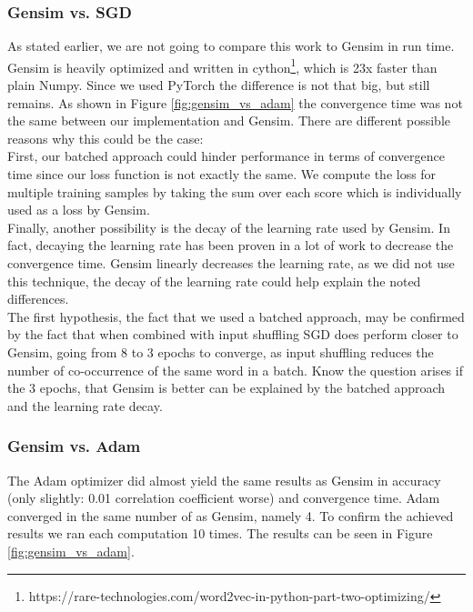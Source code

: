 \subsubsection{Gensim vs. SGD}
As stated earlier, we are not going to compare this work to Gensim in run time. Gensim is heavily optimized and written in cython\footnote{https://rare-technologies.com/word2vec-in-python-part-two-optimizing/}, which is 23x faster than plain Numpy. Since we used PyTorch the difference is not that big, but still remains. As shown in Figure \ref{fig:gensim_vs_adam} the convergence time was not the same between our implementation and Gensim. There are different possible reasons why this could be the case:\\ First, our batched approach could hinder performance in terms of convergence time since our loss function is not exactly the same. We compute the loss for multiple training samples by taking the sum over each score which is individually used as a loss by Gensim.\\ Finally, another possibility is the decay of the learning rate used by Gensim. In fact, decaying the learning rate has been proven in a lot of work to decrease the convergence time. Gensim linearly decreases the learning rate, as we did not use this technique, the decay of the learning rate could help explain the noted differences. \\ The first hypothesis, the fact that we used a batched approach, may be confirmed by the fact that when combined with input shuffling SGD does perform closer to Gensim, going from 8 to 3 epochs to converge, as input shuffling reduces the number of co-occurrence of the same word in a batch.
Know the question arises if the 3 epochs, that Gensim is better can be explained by the batched approach and the learning rate decay.

\subsubsection{Gensim vs. Adam}
The Adam optimizer did almost yield the same results as Gensim in accuracy  (only slightly: 0.01 correlation coefficient worse) and convergence time. Adam converged in the same number of  as Gensim, namely 4. To confirm the achieved results we ran each computation 10 times. The results can be seen in Figure \ref{fig:gensim_vs_adam}.


